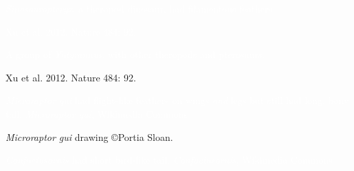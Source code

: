 \documentclass[t]{beamer}
\begin{document}
{
\begin{frame}[t,plain]
\end{frame}
}

{
\begin{frame}[t,plain]{\textcolor{white}{\textit{Sinosauropteryx}, a theropod dinosaur, had filamentous feathers.}}
\end{frame}
}

{
\begin{frame}[t,plain]
\end{frame}
}

{
\begin{frame}[b,plain]
\hfill\tiny\textcolor{white}{Xu et al. 2012. Nature 484: 92.}
\end{frame}
}
{
\begin{frame}[t,plain]{\textcolor{white}{A group of \textit{Yutyrannus}, with other theropods and pterosaurs.} }
\end{frame}
}

{
\begin{frame}[b,plain]
\hfill\tiny Xu et al. 2012. Nature 484: 92.
\end{frame}
}

{
\begin{frame}[b,plain]{\textcolor{white}{\textit{Microraptor gui} had flight-like feathers on wings \emph{and} legs but still had long, bony tail.}}
\hfill\tiny\textcolor{white}{\textit{Microraptor gui}, Wikimedia Commons}
\end{frame}
}

{
\begin{frame}[b,plain]
\tiny\hfill\textit{Microraptor gui} drawing \copyright Portia Sloan.
\end{frame}
}

{
\begin{frame}[b,plain]{\textcolor{white}{\textit{Confuciusornis} had short bird-like tail.}}
\hfill\tiny\textcolor{white}{\textit{Confuciusornis}, Wikimedia Commons}
\end{frame}
}
\end{document}
